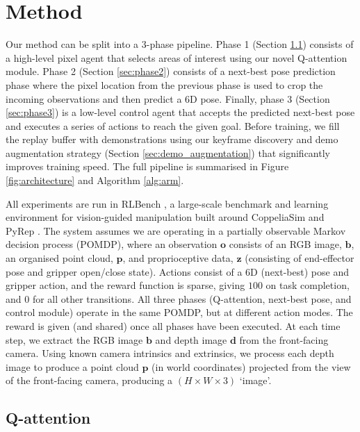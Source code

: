 \documentclass[letterpaper, 10 pt, journal, twoside]{IEEEtran}
\newcommand{\obs}{\mathbf{o}}
\newcommand{\rgb}{\mathbf{b}}
\newcommand{\depth}{\mathbf{d}}
\newcommand{\pcd}{\mathbf{p}}
\newcommand{\proprio}{\mathbf{z}}
\begin{document}
\section{Method}

Our method can be split into a 3-phase pipeline. Phase 1 (Section \ref{sec:phase1}) consists of a high-level pixel agent that selects areas of interest using our novel Q-attention module. Phase 2 (Section \ref{sec:phase2}) consists of a next-best pose prediction phase where the pixel location from the previous phase is used to crop the incoming observations and then predict a 6D pose. Finally, phase 3 (Section \ref{sec:phase3}) is a low-level control agent that accepts the predicted next-best pose and executes a series of actions to reach the given goal. Before training, we fill the replay buffer with demonstrations using our keyframe discovery and demo augmentation strategy (Section \ref{sec:demo_augmentation}) that significantly improves training speed. The full pipeline is summarised in Figure \ref{fig:architecture} and Algorithm \ref{alg:arm}.

All experiments are run in RLBench \cite{james2019rlbench}, a large-scale benchmark and learning environment for vision-guided manipulation built around CoppeliaSim \cite{rohmer2013v} and PyRep \cite{james2019pyrep}. The system assumes we are operating in a partially observable Markov decision process (POMDP), where an observation $\obs$ consists of an RGB image, $\rgb$, an organised point cloud, $\pcd$, and proprioceptive data, $\proprio$ (consisting of end-effector pose and gripper open/close state). Actions consist of a 6D (next-best) pose and gripper action, and the reward function is sparse, giving $100$ on task completion, and $0$ for all other transitions. All three phases (Q-attention, next-best pose, and control module) operate in the same POMDP, but at different action modes. The reward is given (and shared) once all phases have been executed.
At each time step, we extract the RGB image $\rgb$ and depth image $\depth$ from the front-facing camera. Using known camera intrinsics and extrinsics, we process each depth image to produce a point cloud $\pcd$ (in world coordinates) projected from the view of the front-facing camera, producing a $(H \times W \times 3)$ `image'.


\subsection{Q-attention}
\label{sec:phase1}
\end{document}
